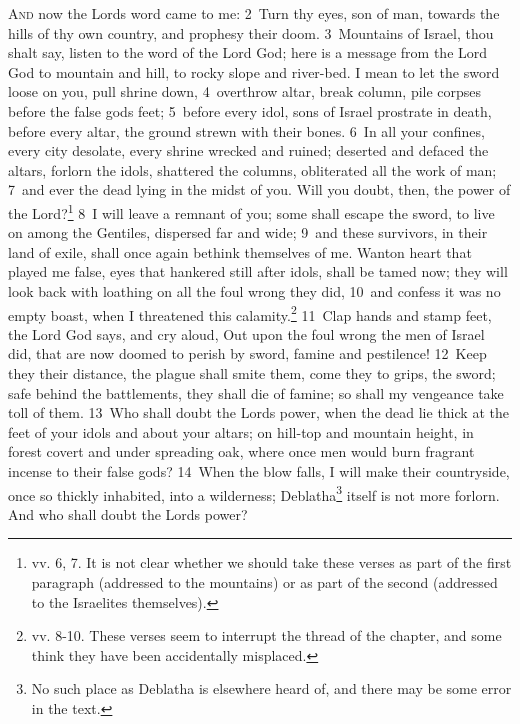 \documentclass[10pt]{book} %
\begin{document}
\lettrine[lines=2]{A}{nd} now the Lord\textquotesingle s word came to me: \textcolor{benred8}{2}~Turn thy eyes, son of man, towards the hills of thy own country, and prophesy their doom. \textcolor{benred8}{3}~Mountains of Israel, thou shalt say, listen to the word of the Lord God; here is a message from the Lord God to mountain and hill, to rocky slope and river-bed. I mean to let the sword loose on you, pull shrine down, \textcolor{benred8}{4}~overthrow altar, break column, pile corpses before the false god\textquotesingle s feet; \textcolor{benred8}{5}~before every idol, sons of Israel prostrate in death, before every altar, the ground strewn with their bones. \textcolor{benred8}{6}~In all your confines, every city desolate, every shrine wrecked and ruined; deserted and defaced the altars, forlorn the idols, shattered the columns, obliterated all the work of man; \textcolor{benred8}{7}~and ever the dead lying in the midst of you. Will you doubt, then, the power of the Lord?\footnote[1]{vv. 6, 7. It is not clear whether we should take these verses as part of the first paragraph (addressed to the mountains) or as part of the second (addressed to the Israelites themselves).}
\textcolor{benred8}{8}~I will leave a remnant of you; some shall escape the sword, to live on among the Gentiles, dispersed far and wide; \textcolor{benred8}{9}~and these survivors, in their land of exile, shall once again bethink themselves of me. Wanton heart that played me false, eyes that hankered still after idols, shall be tamed now; they will look back with loathing on all the foul wrong they did, \textcolor{benred8}{10}~and confess it was no empty boast, when I threatened this calamity.\footnote[2]{vv. 8-10. These verses seem to interrupt the thread of the chapter, and some think they have been accidentally misplaced.}
\textcolor{benred8}{11}~Clap hands and stamp feet, the Lord God says, and cry aloud, Out upon the foul wrong the men of Israel did, that are now doomed to perish by sword, famine and pestilence! \textcolor{benred8}{12}~Keep they their distance, the plague shall smite them, come they to grips, the sword; safe behind the battlements, they shall die of famine; so shall my vengeance take toll of them. \textcolor{benred8}{13}~Who shall doubt the Lord\textquotesingle s power, when the dead lie thick at the feet of your idols and about your altars; on hill-top and mountain height, in forest covert and under spreading oak, where once men would burn fragrant incense to their false gods? \textcolor{benred8}{14}~When the blow falls, I will make their countryside, once so thickly inhabited, into a wilderness; Deblatha\footnote[3]{No such place as Deblatha is elsewhere heard of, and there may be some error in the text.} itself is not more forlorn. And who shall doubt the Lord\textquotesingle s power?
\end{document}

